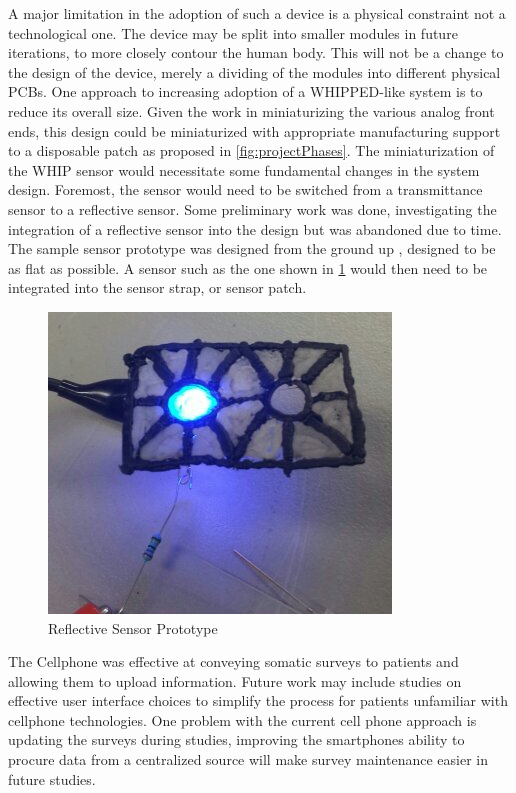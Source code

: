 A major limitation in the adoption of such a device is a physical constraint not a technological one. The device may be split into smaller modules in future iterations, to more closely contour the human body. This will not be a change to the design of the device, merely a dividing of the modules into different physical PCBs. One approach to increasing adoption of a WHIPPED-like system is to reduce its overall size. Given the work in miniaturizing the various analog front ends\cite{AFE4490,ADS1293}, this design could be miniaturized with appropriate manufacturing support to a disposable patch as proposed in \cref{fig:projectPhases}. The miniaturization of the WHIP sensor would necessitate some fundamental changes in the system design. Foremost, the  sensor would need to be switched from a transmittance sensor to a reflective sensor. Some preliminary work was done, investigating the integration of a reflective sensor into the design but was abandoned due to time. The sample sensor prototype was designed from the ground up , designed to be as flat as possible. A sensor such as the one shown in  \cref{fig:ReflectiveSensorPrototypes} would then need to be integrated into the sensor strap, or sensor patch.

\begin{figure}
\centering
\includegraphics[width=0.7\linewidth]{Images/ReflectiveSensorPrototype.png}
\caption{Reflective Sensor Prototype }
\label{fig:ReflectiveSensorPrototypes}
\end{figure}


The Cellphone was effective at conveying somatic surveys to patients and allowing them to upload information. Future work may include studies on effective user interface choices to simplify the process for patients unfamiliar with cellphone technologies. One problem with the current cell phone approach is updating the surveys during studies, improving the smartphones ability to procure data from a centralized source will make survey maintenance easier in future studies.

